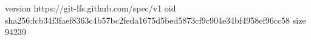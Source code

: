 version https://git-lfs.github.com/spec/v1
oid sha256:fcb34f3faef8363c4b57bc2feda1675d5bed5873cf9c904e34bf4958ef96cc58
size 94239
